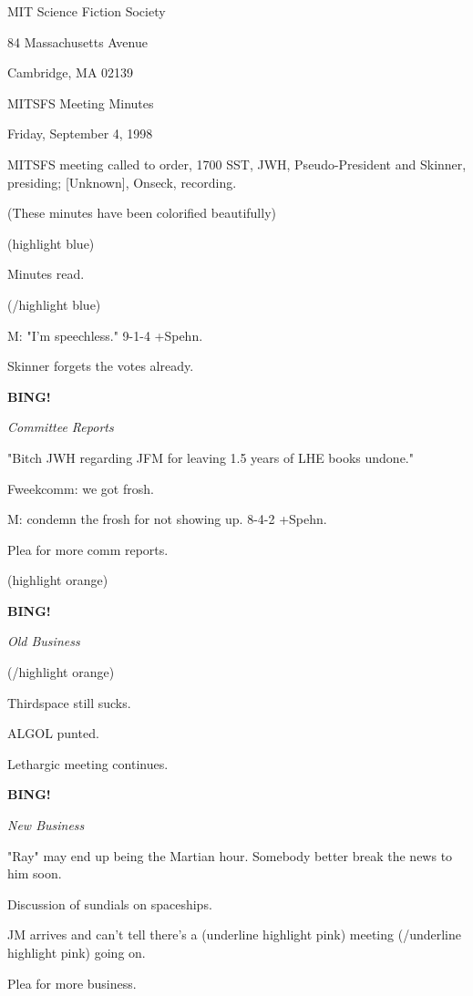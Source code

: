 \documentclass[12pt]{article}
\newcommand{\bing}{{\bf BING!} }
\newcommand{\goto}[1]{\bing \vskip 12pt \centerline{{\em{#1}}}}
\begin{document}
\begin{center}

MIT Science Fiction Society 

84 Massachusetts Avenue

Cambridge, MA 02139

\vspace{12pt}

MITSFS Meeting Minutes 

Friday, September 4, 1998

\end{center}
 
\vspace{18pt}

\setlength{\parskip}{6pt}

\noindent
MITSFS meeting called to order, 1700 SST,
JWH, Pseudo-President and Skinner, presiding; [Unknown], Onseck, recording.

(These minutes have been colorified beautifully)

(highlight blue)

Minutes read.

(/highlight blue)

M: "I'm speechless." 9-1-4 +Spehn.

Skinner forgets the votes already.

\goto{Committee Reports}

"Bitch JWH regarding JFM for leaving 1.5 years of LHE books undone."

Fweekcomm: we got frosh.

M: condemn the frosh for not showing up. 8-4-2 +Spehn.

Plea for more comm reports.

(highlight orange)

\goto{Old Business}

(/highlight orange)

Thirdspace still sucks.

ALGOL punted.

Lethargic meeting continues.

\goto{New Business}

"Ray" may end up being the Martian hour. Somebody better break the news to him soon.

Discussion of sundials on spaceships.

JM arrives and can't tell there's a (underline highlight pink) meeting (/underline highlight pink) going on.

Plea for more business.
\end{document}
